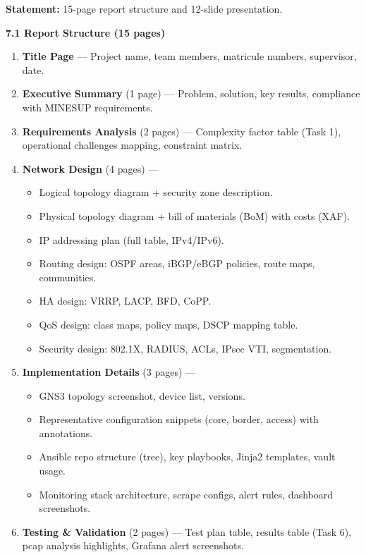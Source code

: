 \documentclass[11pt]{article}
\begin{document}
\begin{exoresolu}
\textbf{Statement:} 15-page report structure and 12-slide presentation.

\tcblower
\textbf{7.1 Report Structure (15 pages)}
\begin{enumerate}
    \item \textbf{Title Page} — Project name, team members, matricule numbers, supervisor, date.
    \item \textbf{Executive Summary} (1 page) — Problem, solution, key results, compliance with MINESUP requirements.
    \item \textbf{Requirements Analysis} (2 pages) — Complexity factor table (Task 1), operational challenges mapping, constraint matrix.
    \item \textbf{Network Design} (4 pages) —
          \begin{itemize}
              \item Logical topology diagram + security zone description.
              \item Physical topology diagram + bill of materials (BoM) with costs (XAF).
              \item IP addressing plan (full table, IPv4/IPv6).
              \item Routing design: OSPF areas, iBGP/eBGP policies, route maps, communities.
              \item HA design: VRRP, LACP, BFD, CoPP.
              \item QoS design: class maps, policy maps, DSCP mapping table.
              \item Security design: 802.1X, RADIUS, ACLs, IPsec VTI, segmentation.
          \end{itemize}
    \item \textbf{Implementation Details} (3 pages) —
          \begin{itemize}
              \item GNS3 topology screenshot, device list, versions.
              \item Representative configuration snippets (core, border, access) with annotations.
              \item Ansible repo structure (tree), key playbooks, Jinja2 templates, vault usage.
              \item Monitoring stack architecture, scrape configs, alert rules, dashboard screenshots.
          \end{itemize}
    \item \textbf{Testing \& Validation} (2 pages) — Test plan table, results table (Task 6), pcap analysis highlights, Grafana alert screenshots.

\end{enumerate}
\end{exoresolu}
\end{document}
